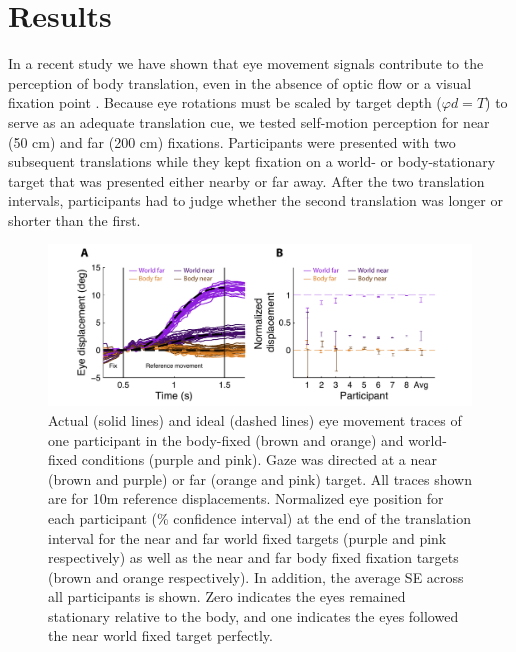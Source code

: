\section{Results}

In a recent study we have shown that eye movement signals contribute to the perception of body translation, even in the absence of optic flow or a visual fixation point \cite{clemens2015a}. Because eye rotations must be scaled by target depth ($\varphi d = T$) to serve as an adequate translation cue, we tested self-motion perception for near (50 \si{\centi\metre}) and far (200 \si{\centi\metre}) fixations. Participants were presented with two subsequent translations  while they kept fixation on a world- or body-stationary target that was presented either nearby or far away. After the two translation intervals, participants had to judge whether the second translation was longer or shorter than the first.

\begin{figure}
    \includegraphics[width=1.0\textwidth]{src/paper4/p4_figure2.pdf}

    \caption{ Actual (solid lines) and ideal (dashed lines) eye movement traces of one participant in the body-fixed (brown and orange) and world-fixed conditions (purple and pink). Gaze was directed at a near (brown and purple) or far (orange and pink) target. All traces shown are for 10m reference displacements.  Normalized eye position for each participant (\% confidence interval) at the end of the translation interval for the near and far world fixed targets (purple and pink respectively) as well as the near and far body fixed fixation targets (brown and orange respectively). In addition, the average \textpm SE across all participants is shown. Zero indicates the eyes remained stationary relative to the body, and one indicates the eyes followed the near world fixed target perfectly.}
    \label{p4:fig2}
\end{figure}

